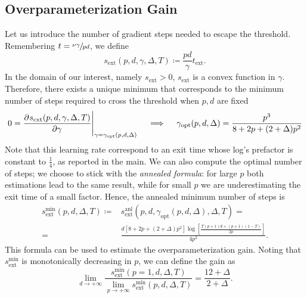 \subsection{Overparameterization Gain} \label{2305:app:overp_gain}
Let us introduce the number of gradient steps needed to escape the threshold. Remembering \(t=\sfrac{\nu\gamma}{pd}\), we define
\begin{equation}
    s_\text{ext}{(p,d,\gamma,\Delta,T)} \coloneqq \frac{pd}{\gamma} t_\text{ext}.
\end{equation}
In the domain of our interest, namely \(s_\text{ext}>0\),  \(s_\text{ext}\) is a convex function in \(\gamma\). Therefore, there exists a unique minimum that corresponds to the minimum number of steps required to cross the threshold when \(p, d\) are fixed
\[
    0=\eval{\dpd{s_\text{ext}{(p,d,\gamma,\Delta,T)}}{\gamma}}_{\gamma = \gamma_\text{opt}{(p,d,\Delta)}}
    \quad \implies \quad
    \gamma_\text{opt}{(p,d,\Delta)} = \frac{p^3}{8+2p+(2+\Delta)p^2}
\]
Note that this learning rate correspond to an exit time whose log's prefactor is constant to \(\frac{1}{4}\), as reported in the main.
We can also compute the optimal number of steps; we choose to stick with the \emph{annealed formula}: for large \(p\) both estimations lead to the same result, while for small \(p\) we are underestimating the exit time of a small factor. Hence, the annealed minimum number of steps is
\[\begin{split}
    s^\text{min}_\text{ext}{(p,d,\Delta,T)}\coloneqq& s^\text{anl}_\text{ext}{(p,d,\gamma_\text{opt}{(p,d,\Delta)},\Delta,T)} = \\ =& \frac{d\left[8+2p+(2+\Delta)p^2\right]\log\left[\frac{T(p+1)d+(p+1)(1-T)}{2 p}\right]}{4p^2}.
\end{split}\]
This formula can be used to estimate the overparameterization gain. Noting that \(s^\text{min}_\text{ext}\) is monotonically decreasing in \(p\), we can define the gain as
\[
    \lim_{d\to+\infty} \frac{s^\text{min}_\text{ext}{(p=1,d,\Delta,T)}}{\lim_{p\to+\infty}s^\text{min}_\text{ext}{(p,d,\Delta,T)}} = \frac{12+\Delta}{2+\Delta}.
\]
